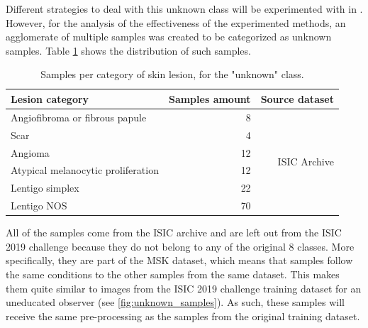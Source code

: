     Different strategies to deal with this unknown class will be experimented with in . However, for the analysis of the effectiveness of the experimented methods, an agglomerate of multiple samples was created to be categorized as unknown samples. Table \ref{tables:out_dist_dataset} shows the distribution of such samples. \par 
    
    \begin{table}[h]
        \centering
        \begin{tabular}{|l|r|r|}
            \hline
            \textbf{Lesion category}           & \multicolumn{1}{l|}{\textbf{Samples amount}} & \multicolumn{1}{l|}{\textbf{Source dataset}} \\ \hline
            Angiofibroma or fibrous papule     & 8                                            & \multirow{6}{*}{ISIC Archive}                \\ \cline{1-2}
            Scar                               & 4                                            &                                              \\ \cline{1-2}
            Angioma                            & 12                                           &                                              \\ \cline{1-2}
            Atypical melanocytic proliferation & 12                                           &                                              \\ \cline{1-2}
            Lentigo simplex                    & 22                                           &                                              \\ \cline{1-2}
            Lentigo NOS                        & 70                                           &                                              \\ \hline
        \end{tabular}
        \caption{Samples per category of skin lesion, for the "unknown" class.}
        \label{tables:out_dist_dataset}
    \end{table}
    
    All of the samples come from the \ac{ISIC} archive \cite{archive} and are left out from the \ac{ISIC} 2019 challenge because they do not belong to any of the original 8 classes. More specifically, they are part of the MSK dataset, which means that samples follow the same conditions to the other samples from the same dataset. This makes them quite similar to images from the \ac{ISIC} 2019 challenge training dataset for an uneducated observer (see \autoref{fig:unknown_samples}). As such, these samples will receive the same pre-processing as the samples from the original training dataset. \par
    
